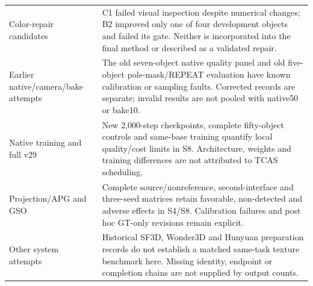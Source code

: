 \documentclass[11pt]{article}
\begin{document}
\begin{longtable}{p{3.3cm}p{10.3cm}}
Color-repair candidates & C1 failed visual inspection despite numerical changes; B2 improved only one of four development objects and failed its gate. Neither is incorporated into the final method or described as a validated repair. \\
Earlier native/camera/bake attempts & The old seven-object native quality panel and old five-object pole-mask/REPEAT evaluation have known calibration or sampling faults. Corrected records are separate; invalid results are not pooled with native50 or bake10. \\
Native training and full v29 & New 2,000-step checkpoints, complete fifty-object controls and same-base training quantify local quality/cost limits in S8. Architecture, weights and training differences are not attributed to TCAS scheduling. \\
Projection/APG and GSO & Complete source/nonreference, second-interface and three-seed matrices retain favorable, non-detected and adverse effects in S4/S8. Calibration failures and post hoc GT-only revisions remain explicit. \\
Other system attempts & Historical SF3D, Wonder3D and Hunyuan preparation records do not establish a matched same-task texture benchmark here. Missing identity, endpoint or completion chains are not supplied by output counts. \\
\bottomrule
\end{longtable}\endgroup
\end{document}
